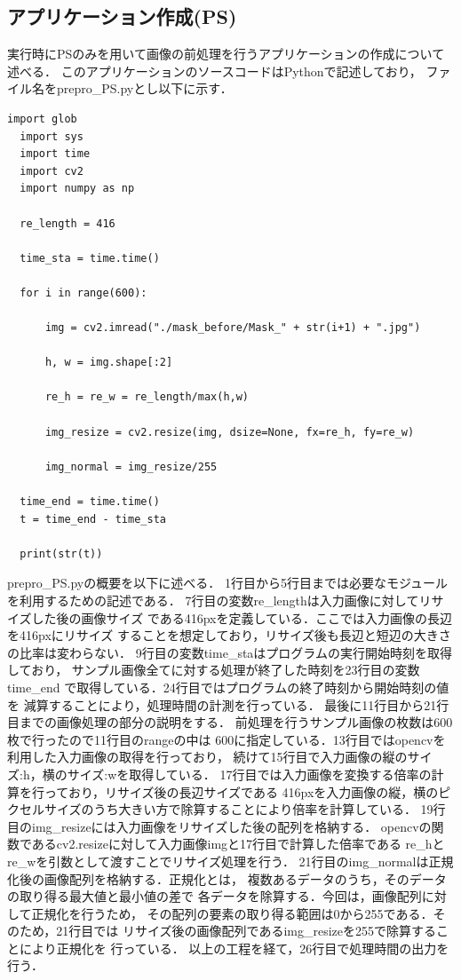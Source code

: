 \documentclass[11pt,a4j]{jreport}
\begin{document}
\subsection{アプリケーション作成(PS)}
実行時にPSのみを用いて画像の前処理を行うアプリケーションの作成について述べる．
このアプリケーションのソースコードはPythonで記述しており，
ファイル名をprepro_PS.pyとし以下に示す．
\begin{lstlisting}[caption=prepro_PS.py]
  import glob
  import sys
  import time
  import cv2
  import numpy as np
  
  re_length = 416
  
  time_sta = time.time()
  
  for i in range(600):
  
      img = cv2.imread("./mask_before/Mask_" + str(i+1) + ".jpg")
  
      h, w = img.shape[:2]
  
      re_h = re_w = re_length/max(h,w)
  
      img_resize = cv2.resize(img, dsize=None, fx=re_h, fy=re_w)
  
      img_normal = img_resize/255
  
  time_end = time.time()
  t = time_end - time_sta
  
  print(str(t))
\end{lstlisting}
prepro_PS.pyの概要を以下に述べる．
1行目から5行目までは必要なモジュールを利用するための記述である．
7行目の変数re_lengthは入力画像に対してリサイズした後の画像サイズ
である416pxを定義している．ここでは入力画像の長辺を416pxにリサイズ
することを想定しており，リサイズ後も長辺と短辺の大きさの比率は変わらない．
9行目の変数time_staはプログラムの実行開始時刻を取得しており，
サンプル画像全てに対する処理が終了した時刻を23行目の変数time_end
で取得している．24行目ではプログラムの終了時刻から開始時刻の値を
減算することにより，処理時間の計測を行っている．
最後に11行目から21行目までの画像処理の部分の説明をする．
前処理を行うサンプル画像の枚数は600枚で行ったので11行目のrangeの中は
600に指定している．13行目ではopencvを利用した入力画像の取得を行っており，
続けて15行目で入力画像の縦のサイズ:h，横のサイズ:wを取得している．
17行目では入力画像を変換する倍率の計算を行っており，リサイズ後の長辺サイズである
416pxを入力画像の縦，横のピクセルサイズのうち大きい方で除算することにより倍率を計算している．
19行目のimg_resizeには入力画像をリサイズした後の配列を格納する．
opencvの関数であるcv2.resizeに対して入力画像imgと17行目で計算した倍率である
re_hとre_wを引数として渡すことでリサイズ処理を行う．
21行目のimg_normalは正規化後の画像配列を格納する．正規化とは，
複数あるデータのうち，そのデータの取り得る最大値と最小値の差で
各データを除算する．今回は，画像配列に対して正規化を行うため，
その配列の要素の取り得る範囲は0から255である．そのため，21行目では
リサイズ後の画像配列であるimg_resizeを255で除算することにより正規化を
行っている．
以上の工程を経て，26行目で処理時間の出力を行う．
\end{document}
